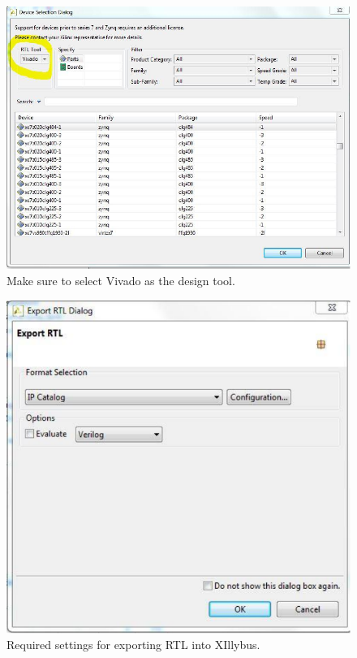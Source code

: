 \begin{figure}[!ht]
\centering
%
\includegraphics{images/xillybus_wrapper}
\caption{Make sure to select Vivado as the design tool.}
\label{fig:xillybus_wrapper}
\end{figure}

\begin{figure}[!h]
\centering
%
\includegraphics{images/xillybus_settings}
\caption{Required settings for exporting RTL into XIllybus.}
\label{fig:xillybus_settings}
\end{figure}

